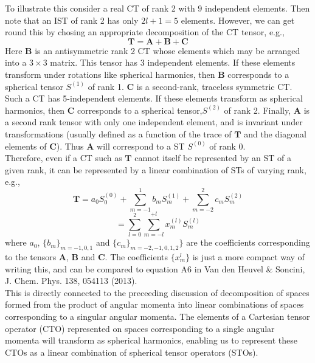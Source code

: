 \documentclass[12pt]{article}
\begin{document}
\noindent To illustrate this consider a real CT of rank 2 with $9$ independent
elements. Then note that an IST of rank 2 has only $2l+1=5$ elements. However,
we can get round this by chosing an appropriate decomposition of the CT tensor,
e.g., \begin{equation} \mathbf{T} = \mathbf{A}+\mathbf{B}+\mathbf{C}
\end{equation} \noindent Here $\mathbf{B}$ is an antisymmetric rank 2 CT whose
elements which may be arranged into a $3\times3$ matrix. This tensor has 3
independent elements. If these elements transform under rotations like
spherical harmonics, then $\mathbf{B}$ corresponds to a spherical tensor
$S^{(1)}$ of rank 1.  $\mathbf{C}$ is a second-rank, traceless symmetric CT.
Such a CT has 5-independent elements.  If these elements transform as spherical
harmonics, then $\mathbf{C}$ corresponds to a spherical tensor,$S^{(2)}$ of
rank 2.  Finally, $\mathbf{A}$ is a second rank tensor with only one
independent element, and is invariant under transformations (usually defined as
a function of the trace of $\mathbf{T}$ and the diagonal elements of
$\mathbf{C}$). Thus $\mathbf{A}$ will correspond to a ST $S^{(0)}$ of rank 0.\\

\noindent Therefore, even if a CT such as  $\mathbf{T}$ cannot itself be
represented by an ST of a given rank, it can be represented by a linear
combination of STs of varying rank, e.g.,
\begin{equation*}
\mathbf{T} =
  a_{0}S^{(0)}_{0}
 +\sum_{m=-1}^{1}b_{m}S_{m}^{(1)}
 +\sum_{m=-2}^{2}c_{m}S_{m}^{(2)}
\end{equation*}
\begin{equation}
 =\sum_{l=0}^{2}\sum_{m=-l}^{+l}x^{(l)}_{m}S_{m}^{(l)}
\end{equation}
where $a_{0}$, $\{b_{m}\}_{m=-1,0,1}$  and $\{c_{m}\}_{m=-2,-1,0,1,2}\}$ are
the coefficients corresponding to the tensors $\mathbf{A}$, $\mathbf{B}$ and
$\mathbf{C}$.  The coefficients $\{x_{m}^{l}\}$ is just a more compact way of
writing this, and can be compared to equation A6 in Van den Heuvel \& Soncini,
J. Chem. Phys. 138, 054113 (2013).\\

\noindent This is directly connected to the preceeding discussion of
decomposition of spaces formed from the product of angular momenta into linear
combinations of spaces corresponding to a singular angular momenta. The
elements of a Cartesian tensor operator (CTO) represented on spaces
corresponding to a single angular momenta will transform as spherical
harmonics, enabling us to represent these CTOs as a linear combination of
spherical tensor operators (STOs).\\
\end{document}
